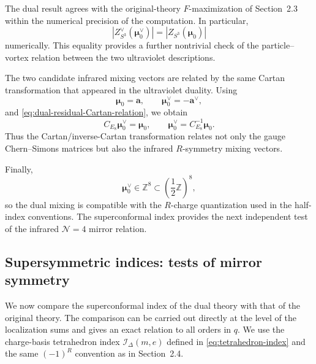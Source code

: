 \documentclass[11pt,a4paper]{article}
\numberwithin{equation}{section}
\begin{document}
The dual result agrees with the original-theory $F$-maximization of Section~2.3 within the numerical precision of the computation.  In particular,
\begin{equation}
  \left|Z_{S^3}^\vee(\boldsymbol\mu_0^\vee)\right|
  =\left|Z_{S^3}(\boldsymbol\mu_0)\right|
  \label{eq:dual-original-S3-match}
\end{equation}
numerically.  This equality provides a further nontrivial check of the particle--vortex relation between the two ultraviolet descriptions.

The two candidate infrared mixing vectors are related by the same Cartan transformation that appeared in the ultraviolet duality.  Using
\begin{equation}
  \boldsymbol\mu_0=\boldsymbol a,
  \qquad
  \boldsymbol\mu_0^\vee=-\boldsymbol a^\vee,
\end{equation}
and \eqref{eq:dual-residual-Cartan-relation}, we obtain
\begin{equation}
  C_{E_8}\boldsymbol\mu_0^\vee
  =\boldsymbol\mu_0,
  \qquad
  \boldsymbol\mu_0^\vee
  =C_{E_8}^{-1}\boldsymbol\mu_0.
  \label{eq:dual-original-mixing-map}
\end{equation}
Thus the Cartan/inverse-Cartan transformation relates not only the gauge Chern--Simons matrices but also the infrared $R$-symmetry mixing vectors.

Finally,
\begin{equation}
  \boldsymbol\mu_0^\vee\in\mathbb Z^8
  \subset\left(\frac12\mathbb Z\right)^8,
  \label{eq:dual-half-integral-mixing}
\end{equation}
so the dual mixing is compatible with the $R$-charge quantization used in the half-index conventions.  The superconformal index provides the next independent test of the infrared $\mathcal N=4$ mirror relation.

\subsection{Supersymmetric indices: tests of mirror symmetry}
\label{subsec:dual-SCI-mirror-map}

We now compare the superconformal index of the dual theory with that of the original theory.  The comparison can be carried out directly at the level of the localization sums and gives an exact relation to all orders in $q$.  We use the charge-basis tetrahedron index $\mathcal I_\Delta(m,e)$ defined in \eqref{eq:tetrahedron-index} and the same $(-1)^R$ convention as in Section~2.4.
\end{document}

